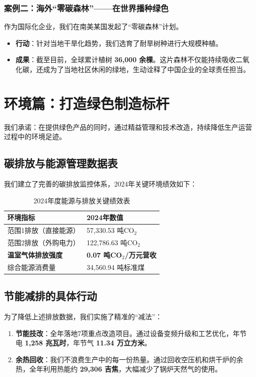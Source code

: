\documentclass[a4paper,12pt]{article}
\begin{document}
\subsubsection{案例二：海外“零碳森林”——在世界播种绿色}
作为国际化企业，我们在南美某国发起了“零碳森林”计划。
\begin{itemize}
    \item \textbf{行动}：针对当地干旱化趋势，我们选育了耐旱树种进行大规模种植。
    \item \textbf{成果}：截至目前，全球累计植树 \textbf{36,000 余棵}。这片森林不仅能持续吸收二氧化碳，还成为了当地社区休闲的绿地，生动诠释了中国企业的全球责任担当。
\end{itemize}

\section{环境篇：打造绿色制造标杆}

我们承诺：在提供绿色产品的同时，通过精益管理和技术改造，持续降低生产运营过程中的环境足迹。

\subsection{碳排放与能源管理数据表}
我们建立了完善的碳排放监控体系，2024年关键环境绩效如下：

\begin{table}[h]
\centering
\caption{2024年度能源与排放关键绩效表}
\begin{tabular}{p{} p{}}
\toprule
\textbf{环境指标} & \textbf{2024年数值} \\
\midrule
范围1排放（直接能源） & 57,330.53 吨CO$_2$ \\
范围2排放（外购电力） & 122,786.63 吨CO$_2$ \\
\textbf{温室气体排放强度} & \textbf{0.07 吨CO$_2$/万元营收} \\
综合能源消费量 & 34,560.94 吨标准煤 \\
\bottomrule
\end{tabular}
\end{table}

\subsection{节能减排的具体行动}
为了降低上述排放数据，我们实施了精准的“减法”：
\begin{enumerate}
    \item \textbf{节能技改}：全年落地7项重点改造项目。通过设备变频升级和工艺优化，年节电 \textbf{1,258 兆瓦时}，年节气 \textbf{11.34 万立方米}。
    \item \textbf{余热回收}：我们不浪费生产中的每一份热量。通过回收空压机和烘干炉的余热，全年利用热能约 \textbf{29,306 吉焦}，大幅减少了锅炉天然气的使用。
\end{enumerate}
\end{document}
